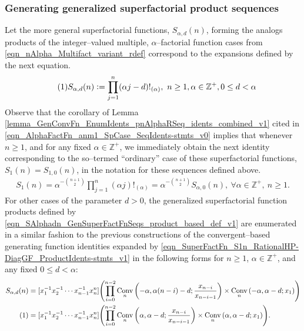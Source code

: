 \documentclass[12pt,reqno]{article}
\numberwithin{sfootnote}{section}
\numberwithin{equation}{section}
\newcommand{\tagonce}[0]{
     \addtocounter{equation}{1}
     \tag{\theequation}
}
\theoremstyle{DefaultTheoremStyle}
\theoremstyle{definition}
\newcommand{\quotetext}[1]{``#1''}
\newcommand{\defequals}{\ensuremath{\vcentcolon=}}
\newcommand{\ConvGF}[4]{\ensuremath{\Conv_{#1}\left(#2, #3; #4\right)}}
\DeclareMathOperator{\Conv}{Conv}
\begin{document}
\subsubsection{Generating generalized superfactorial product sequences} 
Let the more general superfactorial functions, $S_{\alpha,d}(n)$, 
forming the analogs products of the integer--valued 
multiple, $\alpha$--factorial function cases from 
\eqref{eqn_nAlpha_Multifact_variant_rdef} 
correspond to the expansions defined by the next equation. 
\begin{align*} 
\tagonce\label{eqn_SAlphadn_GenSuperFactFnSeqs_product_based_def_v1} 
S_{\alpha,d}(n) & \defequals 
     \prod_{j=1}^{n} (\alpha j - d)!_{(\alpha)},\ 
     n \geq 1, \alpha \in \mathbb{Z}^{+}, 0 \leq d < \alpha 
\end{align*} 
Observe that the corollary of 
Lemma \ref{lemma_GenConvFn_EnumIdents_pnAlphaRSeq_idents_combined_v1} 
cited in \eqref{eqn_AlphaFactFn_anm1_SpCase_SeqIdents-stmts_v0} 
implies that 
whenever $n \geq 1$, and for any fixed $\alpha \in \mathbb{Z}^{+}$, 
we immediately obtain the next identity 
corresponding to the so--termed 
\quotetext{ordinary} case of these 
superfactorial functions, $S_1(n) = S_{1,0}(n)$, 
in the notation for these sequences defined above. 
\begin{align*} 
S_1(n) = \alpha^{-\binom{n+1}{2}} 
     \prod_{j=1}^{n} (\alpha j)!_{(\alpha)} = 
     \alpha^{-\binom{n+1}{2}} S_{\alpha,0}(n),\ 
     \forall \alpha \in \mathbb{Z}^{+},\ n \geq 1. 
\end{align*} 
For other cases of the parameter $d > 0$, the 
generalized superfactorial function products defined by 
\eqref{eqn_SAlphadn_GenSuperFactFnSeqs_product_based_def_v1} 
are enumerated in a similar fashion to the previous 
constructions of the convergent--based generating function 
identities expanded by 
\eqref{eqn_SuperFactFn_S1n_RationalHP-DiagGF_ProductIdents-stmts_v1} 
in the following forms for $n \geq 1$, $\alpha \in \mathbb{Z}^{+}$, 
and any fixed $0 \leq d < \alpha$: 
\begin{align*} 
S_{\alpha,d}(n) 
     & = 
     [x_1^{-1} x_2^{-1} \cdots x_{n-1}^{-1} x_n^{n}] 
     \Biggl( 
     \prod_{i=0}^{n-2} 
     \ConvGF{n}{-\alpha}{\alpha(n-i)-d}{\frac{x_{n-i}}{x_{n-i-1}}} \times 
     \ConvGF{n}{-\alpha}{\alpha-d}{x_1} 
     \Biggr) \\ 
\tagonce\label{eqn_SuperFactFn_S1n_RationalHP-DiagGF_ProductIdents-stmts_v2} 
     & = 
     [x_1^{-1} x_2^{-1} \cdots x_{n-1}^{-1} x_n^{n}] 
     \Biggl( 
     \prod_{i=0}^{n-2} 
     \ConvGF{n}{\alpha}{\alpha-d}{\frac{x_{n-i}}{x_{n-i-1}}} \times 
     \ConvGF{n}{\alpha}{\alpha-d}{x_1} 
     \Biggr). 
\end{align*} 
\end{document}
